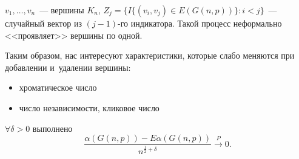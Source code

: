 \documentclass{article}
\begin{document}
$v_1, \ldots, v_n$~--- вершины $K_n$, $Z_j = \{I\{(v_i, v_j) \in E(G(n, p))\}: i < j\}$~---
случайный вектор из $(j-1)$-го индикатора. Такой процесс неформально <<проявляет>> вершины по одной.

Таким образом, нас интересуют характеристики, которые слабо меняются при добавлении и~удалении
вершины:

\begin{itemize}
	\item хроматическое число
	\item число независимости, кликовое число
\end{itemize}

\begin{exercise}
	$\forall \delta > 0$ выполнено
	$$\frac{\alpha(G(n, p)) - E\alpha(G(n, p))}{n^{\frac{1}{2}+\delta}} \overset{P}\rightarrow 0.$$
\end{exercise}
\end{document}
